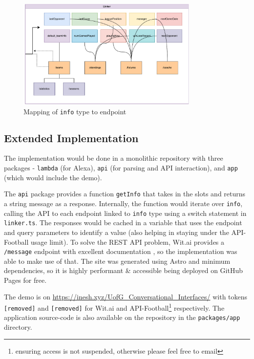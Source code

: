 \documentclass[10pt,a4paper,twocolumn]{article}
\newcommand{\cmmnt}[1]{}
\begin{document}
\begin{figure}
    \centering
    \includegraphics[width=0.8\textwidth]{assets/linker.pdf}
    \caption*{Mapping of \texttt{info} type to endpoint}
\end{figure}

\subsection{Extended Implementation \cmmnt{\small (6 marks)}}

The implementation would be done in a monolithic repository with three packages - \texttt{lambda} (for Alexa), \texttt{api} (for parsing and API interaction), and \texttt{app} (which would include the demo).

The \texttt{api} package provides a function \texttt{getInfo} that takes in the slots and returns a string message as a response. Internally, the function would iterate over \texttt{info}, calling the API to each endpoint linked to \texttt{info} type using a switch statement in \texttt{linker.ts}. The responses would be cached in a variable that uses the endpoint and query parameters to identify a value (also helping in staying under the API-Football usage limit). To solve the REST API problem, Wit.ai provides a \texttt{/message} endpoint with excellent documentation \cite{Witai58:online}, so the implementation was able to make use of that. The site was generated using Astro \cite{Astro7:online} and minimum dependencies, so it is highly performant \& accessible being deployed on GitHub Pages for free.

The demo is on \href{https://inesh.xyz/UofG_Conversational_Interfaces/}{https://inesh.xyz/UofG\_Conversational\_Interfaces/} with tokens \texttt{[removed]} and \texttt{[removed]} for Wit.ai and API-Football\footnote{ensuring access is not suspended, otherwise please feel free to email} respectively. The application source-code is also available on the repository in the \texttt{packages/app} directory.


\footnotesize{}
\end{document}
